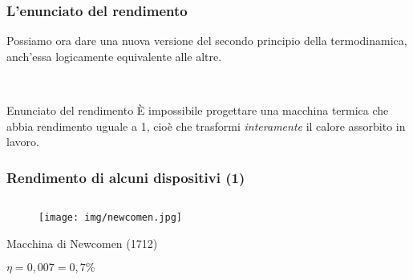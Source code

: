 \documentclass[]{beamer}
\theoremstyle{plain}
\begin{document}
\begin{frame}
\frametitle{L'enunciato del rendimento}
Possiamo ora dare una nuova versione del \alert{secondo principio della termodinamica}, anch'essa logicamente equivalente alle altre.

~
  \begin{block}{Enunciato del rendimento}
    È impossibile progettare una macchina termica che abbia rendimento uguale a 1, cioè che trasformi \emph{interamente} il calore assorbito in lavoro.
  \end{block}
\end{frame}

\begin{frame}
  \frametitle{Rendimento di alcuni dispositivi (1)}
  \begin{columns}
    \begin{column}{0.3\textwidth}
      \begin{figure}
        \texttt{[image: img/newcomen.jpg]}
      \end{figure}
      Macchina di Newcomen (1712)
      
      $ \eta = 0,007 = 0,7 \% $
    \end{column}
    \begin{column}{0.3\textwidth}
    \end{column}
    \begin{column}{0.3\textwidth}
    \end{column}

  \end{columns}
\end{frame}
\end{document}
